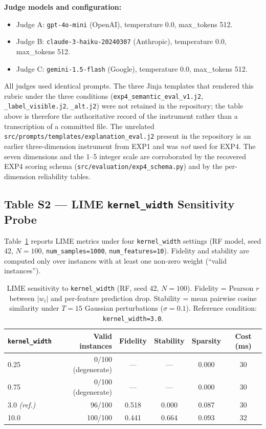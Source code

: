 \documentclass[10pt]{article}
\begin{document}
\noindent\textbf{Judge models and configuration:}
\begin{itemize}\itemsep0pt
  \item Judge A: \texttt{gpt-4o-mini} (OpenAI), temperature 0.0, max\_tokens 512.
  \item Judge B: \texttt{claude-3-haiku-20240307} (Anthropic), temperature 0.0, max\_tokens 512.
  \item Judge C: \texttt{gemini-1.5-flash} (Google), temperature 0.0, max\_tokens 512.
\end{itemize}

\noindent All judges used identical prompts. The three Jinja templates that
rendered this rubric under the three conditions
(\texttt{exp4\_semantic\_eval\_v1.j2}, \texttt{\_label\_visible.j2},
\texttt{\_alt.j2}) were not retained in the repository; the table above is
therefore the authoritative record of the instrument rather than a transcription
of a committed file. The unrelated
\texttt{src/prompts/templates/explanation\_eval.j2} present in the repository is
an earlier three-dimension instrument from EXP1 and was \emph{not} used for
EXP4. The seven dimensions and the 1--5 integer scale are corroborated by the
recovered EXP4 scoring schema (\texttt{src/evaluation/exp4\_schema.py}) and by
the per-dimension reliability tables.

\subsection*{Table S2 — LIME \texttt{kernel\_width} Sensitivity Probe}
\label{sec:supp_kw}

Table~\ref{tab:s2_kw} reports LIME metrics under four \texttt{kernel\_width}
settings (RF model, seed 42, $N=100$, \texttt{num\_samples=1000},
\texttt{num\_features=10}). Fidelity and stability are computed only over
instances with at least one non-zero weight (``valid instances'').

\begin{table}[h]
\centering
\caption{LIME sensitivity to \texttt{kernel\_width} (RF, seed 42, $N=100$).
Fidelity = Pearson $r$ between $|w_i|$ and per-feature prediction drop.
Stability = mean pairwise cosine similarity under $T=15$ Gaussian
perturbations ($\sigma=0.1$). Reference condition: \texttt{kernel\_width=3.0}.}
\label{tab:s2_kw}
\begin{tabular}{lrcccc}
\toprule
\texttt{kernel\_width} & Valid instances & Fidelity & Stability & Sparsity & Cost (ms) \\
\midrule
0.25  & 0/100 (degenerate) & ---   & ---   & 0.000 & 30 \\
0.75  & 0/100 (degenerate) & ---   & ---   & 0.000 & 30 \\
3.0 \emph{(ref.)} & 96/100 & 0.518 & 0.000 & 0.087 & 30 \\
10.0  & 100/100            & 0.441 & 0.664 & 0.093 & 32 \\
\bottomrule
\end{tabular}
\end{table}
\end{document}
